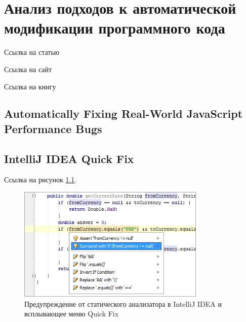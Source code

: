 \chapter{Анализ подходов к автоматической модификации программного кода}

Ссылка на статью\cite{javascript}

Ссылка на сайт\cite{ANTLR}

Ссылка на книгу\cite{java-book}

\section{Automatically Fixing Real-World JavaScript Performance Bugs}


\section{IntelliJ IDEA Quick Fix}

Ссылка на рисунок \ref{fig:idea}.

\begin{figure}[htbp]
	\centering
	\includegraphics[width=0.8\textwidth]{fig/code_analysis_bugs.png}
	\caption{Предупреждение от статического анализатора в IntelliJ IDEA и всплывающее меню Quick Fix}%
	\label{fig:idea}
\end{figure}